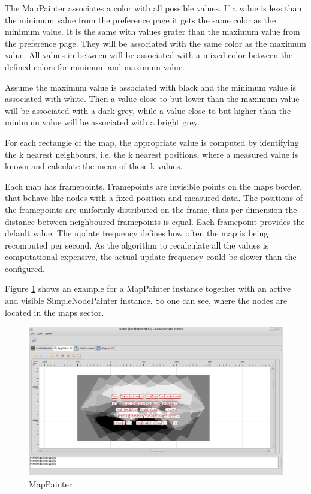 The MapPainter associates a color with all possible values. If a value is less than the minimum value from the
preference page it gets the same color as the minimum value. It is the same with values grater than the maximum
value from the preference page. They will be associated with the same color as the maximum value. All values
in between will be associated with a mixed color between the defined colors for minimum and maximum value.

Assume the maximum value is associated with black and the minimum value is associated with white. Then a
value close to but lower than the maximum value will be associated with a dark grey, while a value close to
but higher than the minimum value will be associated with a bright grey.

For each rectangle of the map, the appropriate value is computed by identifying the k nearest neighbours,
i.e. the k nearest positions, where a measured value is known and calculate the mean of these k values.

Each map has framepoints. Framepoints are invisible points on the maps border, that behave like nodes with
a fixed position and measured data. The positions of the framepoints are uniformly distributed on the frame, thus
per dimension the distance between neighboured framepoints is equal. Each framepoint provides the
default value. The update frequency defines how often the map is being recomputed per second. As the algorithm
to recalculate all the values is computational expensive, the actual update frequency could be slower than the
configured.

Figure \ref{pic:mp} shows an example for a MapPainter instance together with an active and visible SimpleNodePainter
instance. So one can see, where the nodes are located in the maps sector.

\begin{figure}[htb]
  \begin{center}
    \includegraphics[width=13.2cm]{./pics/mappainter}
    \caption{MapPainter}
    \label{pic:mp}
  \end{center}
\end{figure}

